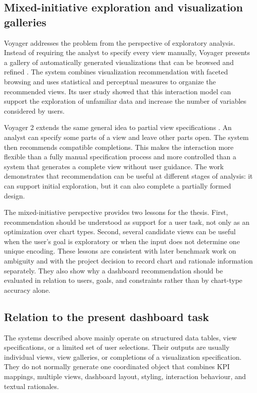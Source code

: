 \subsection{Mixed-initiative exploration and visualization galleries}

Voyager addresses the problem from the perspective of exploratory analysis. Instead of requiring the analyst to specify every view manually, Voyager presents a gallery of automatically generated visualizations that can be browsed and refined \cite{wongsuphasawat2016voyager}. The system combines visualization recommendation with faceted browsing and uses statistical and perceptual measures to organize the recommended views. Its user study showed that this interaction model can support the exploration of unfamiliar data and increase the number of variables considered by users.

Voyager 2 extends the same general idea to partial view specifications \cite{wongsuphasawat2017voyager2}. An analyst can specify some parts of a view and leave other parts open. The system then recommends compatible completions. This makes the interaction more flexible than a fully manual specification process and more controlled than a system that generates a complete view without user guidance. The work demonstrates that recommendation can be useful at different stages of analysis: it can support initial exploration, but it can also complete a partially formed design.

The mixed-initiative perspective provides two lessons for the thesis. First, recommendation should be understood as support for a user task, not only as an optimization over chart types. Second, several candidate views can be useful when the user's goal is exploratory or when the input does not determine one unique encoding. These lessons are consistent with later benchmark work on ambiguity and with the project decision to record chart and rationale information separately. They also show why a dashboard recommendation should be evaluated in relation to users, goals, and constraints rather than by chart-type accuracy alone.

\subsection{Relation to the present dashboard task}

The systems described above mainly operate on structured data tables, view specifications, or a limited set of user selections. Their outputs are usually individual views, view galleries, or completions of a visualization specification. They do not normally generate one coordinated object that combines KPI mappings, multiple views, dashboard layout, styling, interaction behaviour, and textual rationales.

